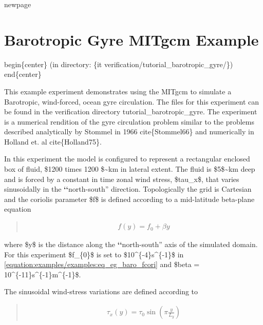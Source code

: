 \documentclass[letterpaper,10pt,english]{sphinxmanual}
\begin{document}
newpage


\section{Barotropic Gyre MITgcm Example}
\label{\detokenize{examples/examples:barotropic-gyre-mitgcm-example}}\label{\detokenize{examples/examples:sec-eg-baro}}
begin\{center\}
(in directory: \{it verification/tutorial\_barotropic\_gyre/\})
end\{center\}

This example experiment demonstrates using the MITgcm to simulate
a Barotropic, wind-forced, ocean gyre circulation. The files for this
experiment can be found in the verification directory tutorial\_barotropic\_gyre.
The experiment is a numerical rendition of the gyre circulation problem similar
to the problems described analytically by Stommel in 1966
cite\{Stommel66\} and numerically in Holland et. al cite\{Holland75\}.

In this experiment the model
is configured to represent a rectangular enclosed box of fluid,
\$1200 times 1200 \$\textasciitilde{}km in lateral extent. The fluid is \$5\$\textasciitilde{}km deep and is forced
by a constant in time zonal wind stress, \$tau\_x\$, that varies sinusoidally
in the {\color{red}\bfseries{}{}`{}`}north-south'' direction. Topologically the grid is Cartesian and
the coriolis parameter \$f\$ is defined according to a mid-latitude beta-plane
equation
\begin{quote}
\label{\detokenize{examples/examples:equation-eq_eg_baro_fcori}}\begin{equation}\label{equation:examples/examples:eq_eg_baro_fcori}
\begin{split}f(y) = f_{0}+\beta y\end{split}
\end{equation}\end{quote}

where \$y\$ is the distance along the {\color{red}\bfseries{}{}`{}`}north-south'' axis of the
simulated domain. For this experiment \$f\_\{0\}\$ is set to \$10\textasciicircum{}\{-4\}s\textasciicircum{}\{-1\}\$ in \eqref{equation:examples/examples:eq_eg_baro_fcori} and \$beta = 10\textasciicircum{}\{-11\}s\textasciicircum{}\{-1\}m\textasciicircum{}\{-1\}\$.

The sinusoidal wind-stress variations are defined according to
\begin{quote}
\begin{equation}\label{equation:examples/examples:eq_eg_baro_taux}
\begin{split}\tau_x(y) = \tau_{0}\sin(\pi \frac{y}{L_y})\end{split}
\end{equation}\end{quote}
\end{document}
